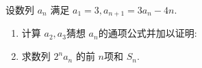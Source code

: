 \documentclass[class=ctexart,crop=false]{standalone}
\begin{document}
设数列 ${a_n}$ 满足 $a_1=3,a_{n+1}=3a_n-4n.$
\begin{enumerate}[label=(\arabic*)]
    \item 计算 $a_2,a_3$猜想 ${a_n}$的通项公式并加以证明:
    \item 求数列 ${2^na_n}$ 的前 $n$项和 $S_n$.
\end{enumerate}
\end{document}
